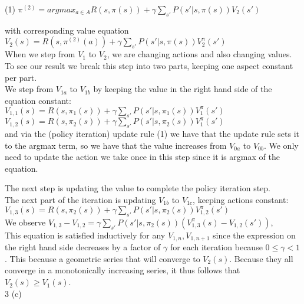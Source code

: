 \documentclass[12pt]{scrartcl}
\begin{document}
(1) $\displaystyle{\pi^{(2)} = argmax_{a \in A} R(s, \pi(s)) + \gamma \sum_{s'}{P(s' | s, \pi(s))V_2(s')}}$

 with corresponding value equation $\displaystyle{V_2(s) = R(s, \pi^{(2)}(a)) +  \gamma \sum_{s'}{P(s' | s, \pi(s))V_2^{\pi}(s')}}$ \\

When we step from $V_1$ to $V_2$, we are changing actions and also changing values. To see our result we break this step into two parts, keeping one aspect constant per part. \\

We step from $V_{1a}$ to $V_{1b}$ by keeping the value in the right hand side of the equation constant: \\
$ V_{1,1}(s) = R(s, \pi_1(s)) +  \gamma \sum_{s'}{P(s' | s, \pi_1(s))V_1^{\pi}(s')}$ \\
$ V_{1,2}(s) = R(s, \pi_2(s)) +  \gamma \sum_{s'}{P(s' | s, \pi_2(s))V_1^{\pi}(s')}$ \\

and via the (policy iteration) update rule (1) we have that the update rule sets it to the argmax term, so we have that the value increases from $V_{0a}$ to $V_{0b}$. We only need to update the action we take once in this step since it is argmax of the equation.

The next step is updating the value to complete the policy iteration step. \\

The next part of the iteration is updating $V_{1b}$ to $V_{1c}$, keeping actions constant: \\

$V_{1,3}(s) = R(s, \pi_2(s)) +  \gamma \sum_{s'}{P(s' | s, \pi_2(s))V_{1,2}^{\pi}(s')}$ \\

We observe $V_{1,3} - V_{1,2} = \gamma \sum_{s'}{P(s' | s, \pi_2(s))(V_{1,3}^{\pi}(s) - V_{1,2}(s'))}$, \\

This equation is satisfied inductively for any $V_{1,n}, V_{1,n+1}$ since the expression on the right hand side decreases by a factor of $\gamma$ for each iteration because $0 \leq \gamma < 1$. This because a geometric series that will converge to $V_2(s)$. Because they all converge in a monotonically increasing series, it thus follows that $V_2(s) \geq V_1(s)$. \\

3 (c) \\ 
\end{document}
